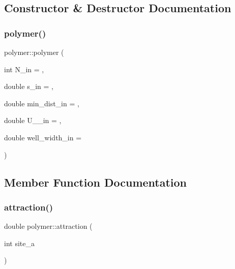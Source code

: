 \subsection{Constructor \& Destructor Documentation}
\hypertarget{classpolymer_abf30f7effe8980e0a4afa2aa2a45c1aa}{}\label{classpolymer_abf30f7effe8980e0a4afa2aa2a45c1aa} 
\subsubsection{\texorpdfstring{polymer()}{polymer()}}
{\footnotesize\ttfamily polymer\+::polymer (\begin{DoxyParamCaption}\item[{int}]{N\+\_\+in = {},  }\item[{double}]{s\+\_\+in = {},  }\item[{double}]{min\+\_\+dist\+\_\+in = {},  }\item[{double}]{U\+\_\+\_\+in = {},  }\item[{double}]{well\+\_\+width\+\_\+in = {} }\end{DoxyParamCaption})\hspace{0.3cm}{\ttfamily [inline]}}



\subsection{Member Function Documentation}
\hypertarget{classpolymer_ad9a1df0e2fea34450c47b9eb9d693e3d}{}\label{classpolymer_ad9a1df0e2fea34450c47b9eb9d693e3d} 
\subsubsection{\texorpdfstring{attraction()}{attraction()}}
{\footnotesize\ttfamily double polymer\+::attraction (\begin{DoxyParamCaption}\item[{int}]{site\+\_\+a }\end{DoxyParamCaption})}

\hypertarget{classpolymer_a67677c98489a609df49e94a457672beb}{}\label{classpolymer_a67677c98489a609df49e94a457672beb} 
